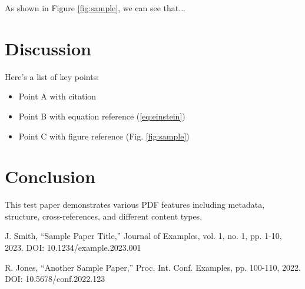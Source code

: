 \documentclass[conference]{IEEEtran}
\begin{document}
As shown in Figure \ref{fig:sample}, we can see that...

\section{Discussion}
Here's a list of key points:
\begin{itemize}
    \item Point A with citation \cite{jones2022}
    \item Point B with equation reference (\ref{eq:einstein})
    \item Point C with figure reference (Fig. \ref{fig:sample})
\end{itemize}

\section{Conclusion}
This test paper demonstrates various PDF features including metadata, structure, cross-references, and different content types.

\begin{thebibliography}{2}
 J. Smith, ``Sample Paper Title,'' Journal of Examples, vol. 1, no. 1, pp. 1-10, 2023. DOI: 10.1234/example.2023.001

 R. Jones, ``Another Sample Paper,'' Proc. Int. Conf. Examples, pp. 100-110, 2022. DOI: 10.5678/conf.2022.123
\end{thebibliography}
\end{document}
